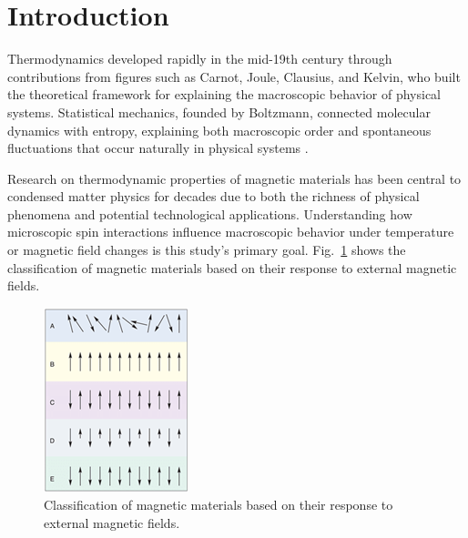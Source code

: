 \documentclass[conference, compsoc, twoside]{IEEEtran}
\begin{document}
\IEEEpeerreviewmaketitle
\thispagestyle{firststyle}

\section{Introduction}

Thermodynamics developed rapidly in the mid-19th century through contributions from figures such as Carnot, Joule, Clausius, and Kelvin, who built the theoretical framework for explaining the macroscopic behavior of physical systems. Statistical mechanics, founded by Boltzmann, connected molecular dynamics with entropy, explaining both macroscopic order and spontaneous fluctuations that occur naturally in physical systems \cite{Pathria2001}.

Research on thermodynamic properties of magnetic materials has been central to condensed matter physics for decades due to both the richness of physical phenomena and potential technological applications. Understanding how microscopic spin interactions influence macroscopic behavior under temperature or magnetic field changes is this study's primary goal. Fig.~\ref{fig:magnetic_classification} shows the classification of magnetic materials based on their response to external magnetic fields.

\begin{figure}[t]
    \centering
    \includegraphics[width=0.9\columnwidth]{Gambar 1. Klasifikasi Magnetik.png}
    \caption{Classification of magnetic materials based on their response to external magnetic fields.}
    \label{fig:magnetic_classification}
\end{figure}
\end{document}

